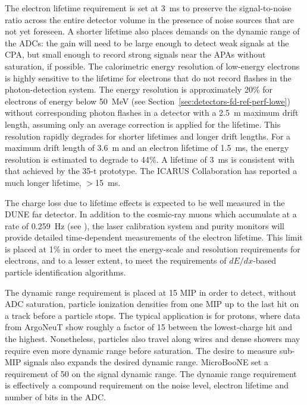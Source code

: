 The electron lifetime requirement %
is set at 3~ms %
 to
preserve the signal-to-noise ratio across the entire detector volume
in the presence of noise sources that are not yet foreseen.  A
shorter lifetime also places demands on the dynamic range of the
ADCs: the gain will need to be large enough
to detect weak
signals at the CPA, but small enough to record %
strong signals near the APAs %
without saturation, if possible.  The
calorimetric energy resolution of low-energy electrons is highly
sensitive to the lifetime for electrons that do not record flashes in
the photon-detection system.  The energy resolution is approximately
20\% for electrons of energy below 50~MeV (see Section~\ref{sec:detectors-fd-ref-perf-lowe}) without corresponding
photon flashes in a detector with a 2.5~m maximum drift length,
assuming only an average correction is applied for the lifetime.  This
resolution rapidly degrades for %
shorter lifetimes and longer drift
lengths.  For a maximum drift length of 3.6~m and an electron lifetime
of 1.5~ms, %
the energy resolution is estimated to degrade to
44\%.  A lifetime of 3~ms is consistent with that achieved by the
35-t prototype.  The ICARUS Collaboration has reported a much longer
lifetime, $>$15~ms\cite{Antonello:2014eha}.

The charge loss due to lifetime effects is expected to be well
measured in the DUNE far detector.  In addition to the cosmic-ray
muons which accumulate at a rate of 0.259~Hz (see \anxrates), the
laser calibration system and purity monitors will provide detailed
time-dependent measurements of the electron lifetime.  This
limit is placed at 1\% in order to meet the energy-scale and resolution
requirements for electrons, and to a lesser extent, to meet the requirements
of $dE/dx$-based particle identification algorithms.

The dynamic range requirement is placed at 15 MIP in order to detect, without ADC saturation, particle
ionization densities from one MIP up to the last hit on a track before
a particle stops.  The typical application is for protons, where data
from ArgoNeuT show roughly a factor of 15 between the lowest-charge
hit and the highest.  Nonetheless, particles also travel along wires
and dense showers may require even more dynamic range before
saturation.  The desire to measure sub-MIP signals also expands the
desired dynamic range.  MicroBooNE set a requirement of 50 on the
signal dynamic range\cite{microboonetdr}.  The dynamic range
requirement is effectively a compound requirement on the noise level,
electron lifetime and number of bits in the ADC.


